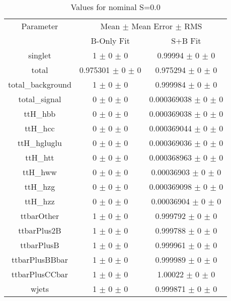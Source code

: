 \begin{table}
\centering
\caption{Values for nominal S=0.0}
\begin{tabular}{ccc}
\toprule
Parameter & \multicolumn{2}{c}{Mean $\pm$ Mean Error $\pm$ RMS}\\
 & B-Only Fit & S+B Fit\\
\midrule
singlet & \num{1} $\pm$ \num{0} $\pm$ \num{0} & \num{0.99994} $\pm$ \num{0} $\pm$ \num{0}\\
total & \num{0.975301} $\pm$ \num{0} $\pm$ \num{0} & \num{0.975294} $\pm$ \num{0} $\pm$ \num{0}\\
total\_background & \num{1} $\pm$ \num{0} $\pm$ \num{0} & \num{0.999984} $\pm$ \num{0} $\pm$ \num{0}\\
total\_signal & \num{0} $\pm$ \num{0} $\pm$ \num{0} & \num{0.000369038} $\pm$ \num{0} $\pm$ \num{0}\\
ttH\_hbb & \num{0} $\pm$ \num{0} $\pm$ \num{0} & \num{0.000369038} $\pm$ \num{0} $\pm$ \num{0}\\
ttH\_hcc & \num{0} $\pm$ \num{0} $\pm$ \num{0} & \num{0.000369044} $\pm$ \num{0} $\pm$ \num{0}\\
ttH\_hgluglu & \num{0} $\pm$ \num{0} $\pm$ \num{0} & \num{0.000369036} $\pm$ \num{0} $\pm$ \num{0}\\
ttH\_htt & \num{0} $\pm$ \num{0} $\pm$ \num{0} & \num{0.000368963} $\pm$ \num{0} $\pm$ \num{0}\\
ttH\_hww & \num{0} $\pm$ \num{0} $\pm$ \num{0} & \num{0.00036903} $\pm$ \num{0} $\pm$ \num{0}\\
ttH\_hzg & \num{0} $\pm$ \num{0} $\pm$ \num{0} & \num{0.000369098} $\pm$ \num{0} $\pm$ \num{0}\\
ttH\_hzz & \num{0} $\pm$ \num{0} $\pm$ \num{0} & \num{0.00036904} $\pm$ \num{0} $\pm$ \num{0}\\
ttbarOther & \num{1} $\pm$ \num{0} $\pm$ \num{0} & \num{0.999792} $\pm$ \num{0} $\pm$ \num{0}\\
ttbarPlus2B & \num{1} $\pm$ \num{0} $\pm$ \num{0} & \num{0.999788} $\pm$ \num{0} $\pm$ \num{0}\\
ttbarPlusB & \num{1} $\pm$ \num{0} $\pm$ \num{0} & \num{0.999961} $\pm$ \num{0} $\pm$ \num{0}\\
ttbarPlusBBbar & \num{1} $\pm$ \num{0} $\pm$ \num{0} & \num{0.999989} $\pm$ \num{0} $\pm$ \num{0}\\
ttbarPlusCCbar & \num{1} $\pm$ \num{0} $\pm$ \num{0} & \num{1.00022} $\pm$ \num{0} $\pm$ \num{0}\\
wjets & \num{1} $\pm$ \num{0} $\pm$ \num{0} & \num{0.999871} $\pm$ \num{0} $\pm$ \num{0}\\
\bottomrule
\end{tabular}
\end{table}